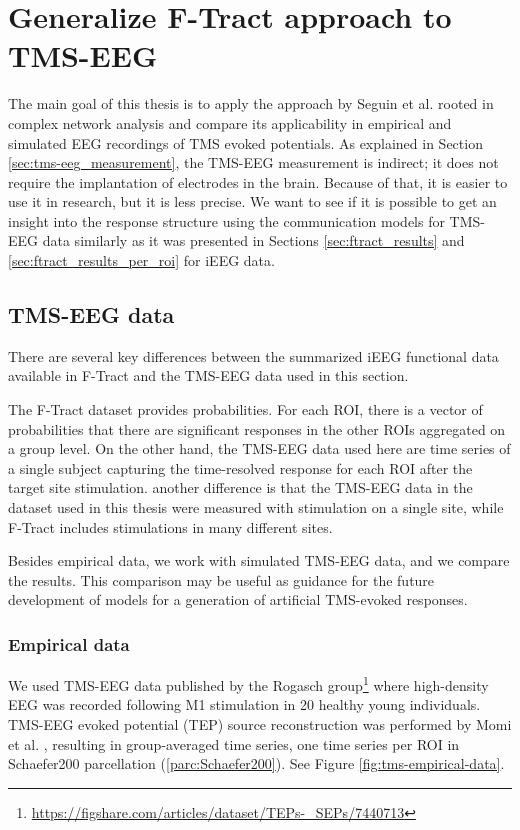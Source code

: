 \chapter{Generalize F-Tract approach to TMS-EEG}\label{ch:pytepfit}

The main goal of this thesis is to apply the approach by Seguin et al. \cite{seguin_communication_2023} rooted in complex network analysis and compare its applicability in empirical and simulated EEG recordings of TMS evoked potentials. As explained in Section \ref{sec:tms-eeg_measurement}, the TMS-EEG measurement is indirect; it does not require the implantation of electrodes in the brain. Because of that, it is easier to use it in research, but it is less precise. We want to see if it is possible to get an insight into the response structure using the communication models for TMS-EEG data similarly as it was presented in Sections \ref{sec:ftract_results} and \ref{sec:ftract_results_per_roi} for iEEG data. 

\section{TMS-EEG data}\label{sec:reponse_definition}

There are several key differences between the summarized iEEG functional data available in F-Tract and the TMS-EEG data used in this section. 

The F-Tract dataset provides probabilities. For each ROI, there is a vector of probabilities that there are significant responses in the other ROIs aggregated on a group level. On the other hand, the TMS-EEG data used here are time series of a single subject capturing the time-resolved response for each ROI after the target site stimulation. another difference is that the TMS-EEG data in the dataset used in this thesis were measured with stimulation on a single site, while F-Tract includes stimulations in many different sites.

Besides empirical data, we work with simulated TMS-EEG data, and we compare the results. This comparison may be useful as guidance for the future development of models for a generation of artificial TMS-evoked responses.

\subsection{Empirical data}

We used TMS-EEG data published by the Rogasch group\footnote{\url{https://figshare.com/articles/dataset/TEPs-_SEPs/7440713}} \cite{biabani_characterizing_2019} where high-density EEG was recorded following M1 stimulation in 20 healthy young individuals. TMS-EEG evoked potential (TEP) source reconstruction was performed by Momi et al. \cite{momi_tms-evoked_2023}, resulting in group-averaged time series, one time series per ROI in Schaefer200 parcellation (\ref{parc:Schaefer200}). See Figure \ref{fig:tms-empirical-data}. 

